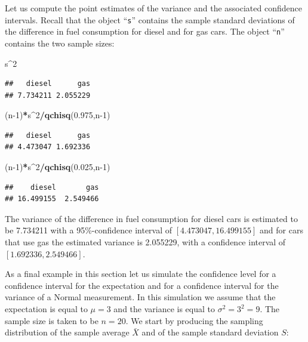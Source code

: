 \documentclass[
]{krantz}
\makeatletter
\newenvironment{Shaded}{\begin{snugshade}}{\end{snugshade}}
\newcommand{\DecValTok}[1]{\textcolor[rgb]{0.00,0.00,0.81}{#1}}
\newcommand{\FloatTok}[1]{\textcolor[rgb]{0.00,0.00,0.81}{#1}}
\newcommand{\KeywordTok}[1]{\textcolor[rgb]{0.13,0.29,0.53}{\textbf{#1}}}
\newcommand{\NormalTok}[1]{#1}
\newcommand{\OperatorTok}[1]{\textcolor[rgb]{0.81,0.36,0.00}{\textbf{#1}}}
\newenvironment{kframe}{%
\medskip{}
\setlength{\fboxsep}{.8em}
 \def\at@end@of@kframe{}%
 \ifinner\ifhmode%
  \def\at@end@of@kframe{\end{minipage}}%
  \begin{minipage}{\columnwidth}%
 \fi\fi%
 \def\FrameCommand##1{\hskip\@totalleftmargin \hskip-\fboxsep
 \colorbox{shadecolor}{##1}\hskip-\fboxsep
     \hskip-\linewidth \hskip-\@totalleftmargin \hskip\columnwidth}%
 \MakeFramed {\advance\hsize-\width
   \@totalleftmargin\z@ \linewidth\hsize
   \@setminipage}}%
 {\par\unskip\endMakeFramed%
 \at@end@of@kframe}
\renewenvironment{Shaded}{\begin{kframe}}{\end{kframe}}
\theoremstyle{definition}
\theoremstyle{definition}
\theoremstyle{definition}
\theoremstyle{remark}
\makeatother
\begin{document}
Let us compute the point estimates of the variance and the associated
confidence intervals. Recall that the object ``\texttt{s}'' contains the sample
standard deviations of the difference in fuel consumption for diesel and
for gas cars. The object ``\texttt{n}'' contains the two sample sizes:

\begin{Shaded}
\begin{Highlighting}[]
\NormalTok{s}\OperatorTok{^}\DecValTok{2}
\end{Highlighting}
\end{Shaded}

\begin{verbatim}
##   diesel      gas 
## 7.734211 2.055229
\end{verbatim}

\begin{Shaded}
\begin{Highlighting}[]
\NormalTok{(n}\DecValTok{-1}\NormalTok{)}\OperatorTok{*}\NormalTok{s}\OperatorTok{^}\DecValTok{2}\OperatorTok{/}\KeywordTok{qchisq}\NormalTok{(}\FloatTok{0.975}\NormalTok{,n}\DecValTok{-1}\NormalTok{)}
\end{Highlighting}
\end{Shaded}

\begin{verbatim}
##   diesel      gas 
## 4.473047 1.692336
\end{verbatim}

\begin{Shaded}
\begin{Highlighting}[]
\NormalTok{(n}\DecValTok{-1}\NormalTok{)}\OperatorTok{*}\NormalTok{s}\OperatorTok{^}\DecValTok{2}\OperatorTok{/}\KeywordTok{qchisq}\NormalTok{(}\FloatTok{0.025}\NormalTok{,n}\DecValTok{-1}\NormalTok{)}
\end{Highlighting}
\end{Shaded}

\begin{verbatim}
##    diesel       gas 
## 16.499155  2.549466
\end{verbatim}

The variance of the difference in fuel consumption for diesel cars is
estimated to be 7.734211 with a 95\%-confidence interval of
\([4.473047, 16.499155]\) and for cars that use gas the estimated variance
is 2.055229, with a confidence interval of \([1.692336, 2.549466]\).

As a final example in this section let us simulate the confidence level
for a confidence interval for the expectation and for a confidence
interval for the variance of a Normal measurement. In this simulation we
assume that the expectation is equal to \(\mu = 3\) and the variance is
equal to \(\sigma^2 = 3^2 = 9\). The sample size is taken to be \(n=20\). We
start by producing the sampling distribution of the sample average
\(\bar X\) and of the sample standard deviation \(S\):
\end{document}
